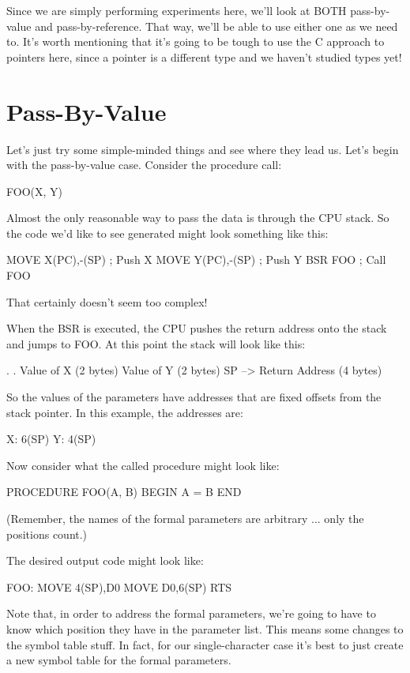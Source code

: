 \documentclass[float=false, crop=false]{standalone}
\begin{document}
Since we are simply performing experiments here, we'll look at BOTH
pass-by-value and pass-by-reference. That way, we'll be able to use either one
as we need to. It's worth mentioning that it's going to be tough to use the C
approach to pointers here, since a pointer is a different type and we haven't
studied types yet!


\section{Pass-By-Value}

Let's just try some simple-minded things and see where they lead us. Let's begin
with the pass-by-value case. Consider the procedure call:


     FOO(X, Y)


Almost the only reasonable way to pass the data is through the CPU stack. So the
code we'd like to see generated might look something like this:


     MOVE X(PC),-(SP)    ; Push X
     MOVE Y(PC),-(SP)    ; Push Y
     BSR FOO             ; Call FOO


That certainly doesn't seem too complex!

When the BSR is executed, the CPU pushes the return address onto the stack and
jumps to FOO. At this point the stack will look like this:

          .
          .
          Value of X (2 bytes)
          Value of Y (2 bytes)
  SP -->  Return Address (4 bytes)


So the values of the parameters have addresses that are fixed offsets from the
stack pointer. In this example, the addresses are:


     X:  6(SP)
     Y:  4(SP)


Now consider what the called procedure might look like:


     PROCEDURE FOO(A, B)
     BEGIN
          A = B
     END

(Remember, the names of the formal parameters are arbitrary ... only the
positions count.)

The desired output code might look like:


     FOO: MOVE 4(SP),D0
          MOVE D0,6(SP)
          RTS


Note that, in order to address the formal parameters, we're going to have to
know which position they have in the parameter list. This means some changes to
the symbol table stuff. In fact, for our single-character case it's best to just
create a new symbol table for the formal parameters.
\end{document}
